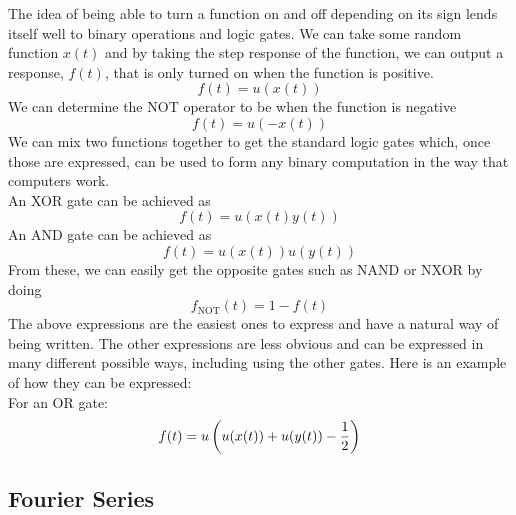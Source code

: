 \documentclass[11pt, fleqn]{article}
\begin{document}
The idea of being able to turn a function on and off depending on its sign lends itself well to binary operations and logic gates. We can take some random function $x(t)$ and by taking the step response of the function, we can output a response, $f(t)$, that is only turned on when the function is positive.
\[ f(t)=u(x(t)) \]
We can determine the NOT operator to be when the function is negative
\[ f(t)=u(-x(t)) \]
We can mix two functions together to get the standard logic gates which, once those are expressed, can be used to form any binary computation in the way that computers work.\\
An XOR gate can be achieved as
$$f(t)=u(x(t)y(t))$$
An AND gate can be achieved as
$$f(t)=u(x(t))u(y(t))$$
From these, we can easily get the opposite gates such as NAND or NXOR by doing
$$f_\text{NOT}(t)=1-f(t)$$
The above expressions are the easiest ones to express and have a natural way of being written. The other expressions are less obvious and can be expressed in many different possible ways, including using the other gates. Here is an example of how they can be expressed:\\
For an OR gate:
$$f(t)=u\left( u(x(t))+u(y(t))-\frac{1}{2} \right)$$

























\subsection{Fourier Series}
\end{document}
